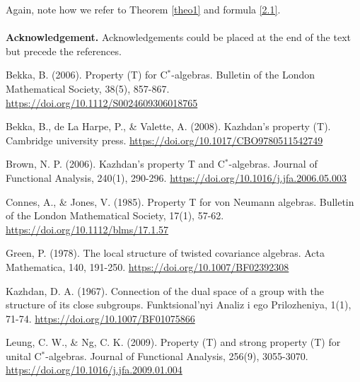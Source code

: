 \documentclass[12pt, reqno]{amsart}
\theoremstyle{definition}
\theoremstyle{remark}
\numberwithin{equation}{section}
\begin{document}
Again, note how we refer to Theorem \ref{theo1} and formula \eqref{2.1}.
\\
\\
{\bf Acknowledgement.} Acknowledgements could be placed at the end
of the text but precede the references.



\begin{thebibliography}{99}

 Bekka, B. (2006). Property (T) for C$^*$-algebras. Bulletin of the London Mathematical Society, 38(5), 857-867.
\url{https://doi.org/10.1112/S0024609306018765}

  Bekka, B., de La Harpe, P., \& Valette, A. (2008). Kazhdan's property (T). Cambridge university press.
\url{https://doi.org/10.1017/CBO9780511542749}

 Brown, N. P. (2006). Kazhdan's property T and C$^*$-algebras. Journal of Functional Analysis, 240(1), 290-296.
\url{https://doi.org/10.1016/j.jfa.2006.05.003}


  Connes, A., \& Jones, V. (1985). Property T for von Neumann algebras. Bulletin of the London Mathematical Society, 17(1), 57-62.
\url{https://doi.org/10.1112/blms/17.1.57}

  Green, P. (1978). The local structure of twisted covariance algebras. Acta Mathematica, 140, 191-250.
\url{https://doi.org/10.1007/BF02392308}
    
 Kazhdan, D. A. (1967). Connection of the dual space of a group with the structure of its close subgroups. Funktsional'nyi Analiz i ego Prilozheniya, 1(1), 71-74.
\url{https://doi.org/10.1007/BF01075866}

 Leung, C. W., \& Ng, C. K. (2009). Property (T) and strong property (T) for unital C$^*$-algebras. Journal of Functional Analysis, 256(9), 3055-3070.
\url{https://doi.org/10.1016/j.jfa.2009.01.004}



\end{thebibliography}
\end{document}
